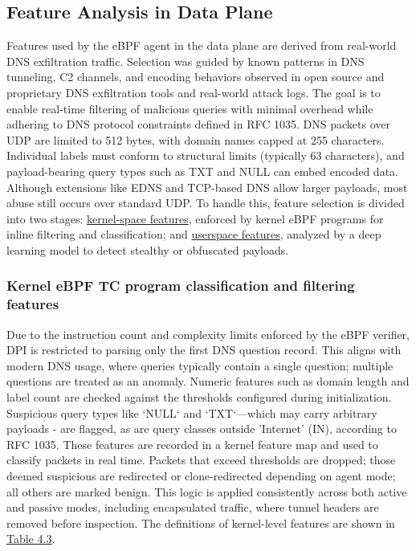 \documentclass [11pt, proquest] {uwthesis}[2020/02/24]
\begin{document}
\subsection{Feature Analysis in Data Plane}
\label{sec:features}
Features used by the eBPF agent in the data plane are derived from real-world DNS exfiltration traffic. Selection was guided by known patterns in DNS tunneling, C2 channels, and encoding behaviors observed in open source and proprietary DNS exfiltration tools and real-world attack logs. The goal is to enable real-time filtering of malicious queries with minimal overhead while adhering to DNS protocol constraints defined in RFC 1035. DNS packets over UDP are limited to 512 bytes, with domain names capped at 255 characters. Individual labels must conform to structural limits (typically 63 characters), and payload-bearing query types such as TXT and NULL can embed encoded data. Although extensions like EDNS and TCP-based DNS allow larger payloads, most abuse still occurs over standard UDP. To handle this, feature selection is divided into two stages: \hyperref[sec:kernel-features]{kernel-space features}, enforced by kernel eBPF programs for inline filtering and classification; and \hyperref[sec:userspace-features]{userspace features}, analyzed by a deep learning model to detect stealthy or obfuscated payloads.

\subsubsection{Kernel eBPF TC program classification and filtering features}
\label{sec:kernel-features}
Due to the instruction count and complexity limits enforced by the eBPF verifier, DPI is restricted to parsing only the first DNS question record. This aligns with modern DNS usage, where queries typically contain a single question; multiple questions are treated as an anomaly. Numeric features such as domain length and label count are checked against the thresholds configured during initialization. Suspicious query types like `NULL` and `TXT`—which may carry arbitrary payloads - are flagged, as are query classes outside 'Internet' (IN), according to RFC 1035. These features are recorded in a kernel feature map and used to classify packets in real time. Packets that exceed thresholds are dropped; those deemed suspicious are redirected or clone-redirected depending on agent mode; all others are marked benign. This logic is applied consistently across both active and passive modes, including encapsulated traffic, where tunnel headers are removed before inspection. The definitions of kernel-level features are shown in \hyperref[sec:feature-kernel]{Table 4.3}.
\end{document}
